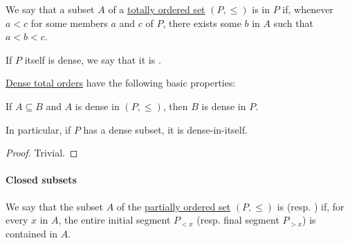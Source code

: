 \begin{definition}\label{def:dense_total_order}
  We say that a subset \( A \) of a \hyperref[def:totally_ordered_set]{totally ordered set} \( (P, \leq) \) is  in \( P \) if, whenever \( a < c \) for some members \( a \) and \( c \) of \( P \), there exists some \( b \) in \( A \) such that \( a < b < c \).

  If \( P \) itself is dense, we say that it is .
\end{definition}

\begin{proposition}\label{thm:def:dense_total_order}
  \hyperref[def:dense_total_order]{Dense total orders} have the following basic properties:
  \begin{thmenum}
     If \( A \subseteq B \) and \( A \) is dense in \( (P, \leq) \), then \( B \) is dense in \( P \).

    In particular, if \( P \) has a dense subset, it is dense-in-itself.
  \end{thmenum}
\end{proposition}
\begin{proof}
   Trivial.
\end{proof}

\paragraph{Closed subsets}

\begin{definition}\label{def:closed_ordered_subset}
  We say that the subset \( A \) of the \hyperref[def:partially_ordered_set]{partially ordered set} \( (P, \leq) \) is  (resp. ) if, for every \( x \) in \( A \), the entire initial segment \( P_{<x} \) (resp. final segment \( P_{>x} \)) is contained in \( A \).
\end{definition}

